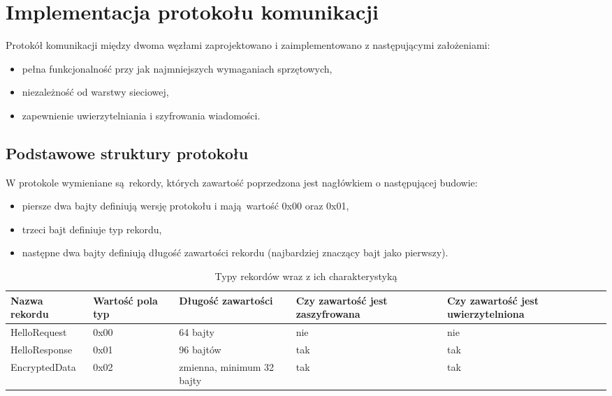 \chapter{Implementacja protokołu komunikacji}
\label{cha:implementacja}

Protokół komunikacji między dwoma węzłami zaprojektowano i zaimplementowano z następującymi założeniami:

\begin{itemize}
\item pełna funkcjonalność przy jak najmniejszych wymaganiach sprzętowych,
\item niezależność od warstwy sieciowej,
\item zapewnienie uwierzytelniania i szyfrowania wiadomości.
\end{itemize}

\section{Podstawowe struktury protokołu}
\label{sec:proto}

W protokole wymieniane są rekordy, których zawartość poprzedzona jest nagłówkiem o następującej budowie:

\begin{itemize}
\item piersze dwa bajty definiują wersję protokołu i mają wartość 0x00 oraz 0x01,
\item trzeci bajt definiuje typ rekordu,
\item następne dwa bajty definiują długość zawartości rekordu (najbardziej znaczący bajt jako pierwszy).
\end{itemize}

\begin{table}[t]
\centering
\caption{Typy rekordów wraz z ich charakterystyką}
\begin{tabular}{|l|p{1.4cm}|l|p{2.9cm}|p{3.1cm}|}
    \hline
    \textbf{Nazwa rekordu}  &
    \textbf{Wartość pola typ}  &
    \textbf{Długość zawartości}  &
    \textbf{Czy zawartość jest zaszyfrowana}  &
    \textbf{Czy zawartość jest uwierzytelniona}\\
    \hline
    HelloRequest & 0x00 & 64 bajty & nie & nie\\
    \hline
    HelloResponse & 0x01 & 96 bajtów & tak & tak\\
    \hline
    EncryptedData & 0x02 & zmienna, minimum 32 bajty & tak & tak\\
    \hline
\end{tabular}
\label{tab:recordtypes}
\end{table}


